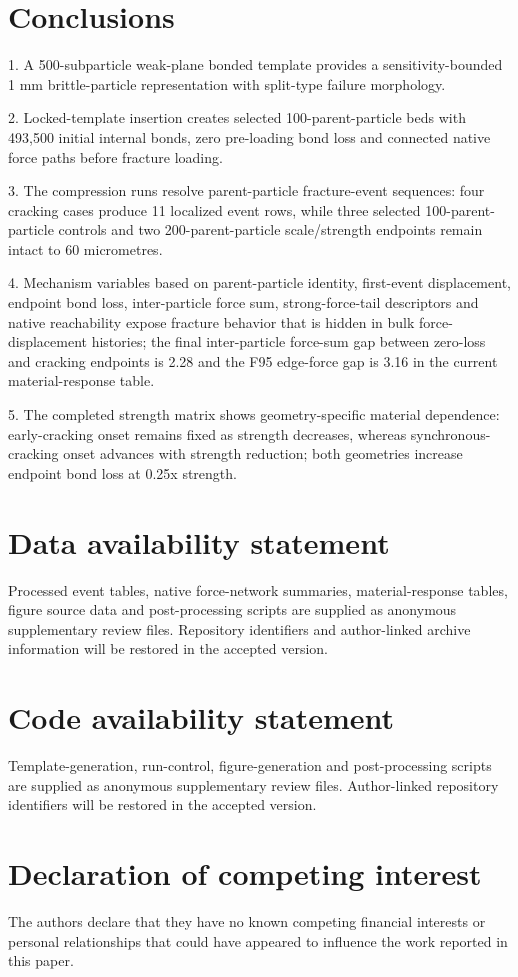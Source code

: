 \documentclass[preprint,12pt]{elsarticle}
\begin{document}
\section{Conclusions}

1. A 500-subparticle weak-plane bonded template provides a sensitivity-bounded 1 mm brittle-particle representation with split-type failure morphology.

2. Locked-template insertion creates selected 100-parent-particle beds with 493,500 initial internal bonds, zero pre-loading bond loss and connected native force paths before fracture loading.

3. The compression runs resolve parent-particle fracture-event sequences: four cracking cases produce 11 localized event rows, while three selected 100-parent-particle controls and two 200-parent-particle scale/strength endpoints remain intact to 60 micrometres.

4. Mechanism variables based on parent-particle identity, first-event displacement, endpoint bond loss, inter-particle force sum, strong-force-tail descriptors and native reachability expose fracture behavior that is hidden in bulk force-displacement histories; the final inter-particle force-sum gap between zero-loss and cracking endpoints is 2.28 and the F95 edge-force gap is 3.16 in the current material-response table.

5. The completed strength matrix shows geometry-specific material dependence: early-cracking onset remains fixed as strength decreases, whereas synchronous-cracking onset advances with strength reduction; both geometries increase endpoint bond loss at 0.25x strength.


\section{Data availability statement}

Processed event tables, native force-network summaries, material-response tables, figure source data and post-processing scripts are supplied as anonymous supplementary review files. Repository identifiers and author-linked archive information will be restored in the accepted version.


\section{Code availability statement}

Template-generation, run-control, figure-generation and post-processing scripts are supplied as anonymous supplementary review files. Author-linked repository identifiers will be restored in the accepted version.




\section{Declaration of competing interest}

The authors declare that they have no known competing financial interests or personal relationships that could have appeared to influence the work reported in this paper.





\end{document}
